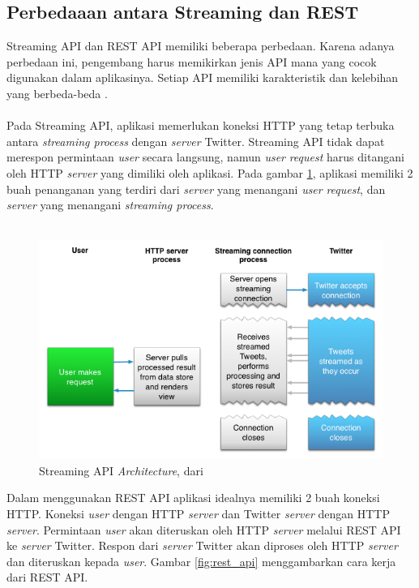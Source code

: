 \subsection{Perbedaaan antara Streaming dan REST}
Streaming API dan REST API memiliki beberapa perbedaan. Karena adanya perbedaan ini, pengembang harus memikirkan jenis API mana yang cocok digunakan dalam aplikasinya. Setiap API memiliki karakteristik dan kelebihan yang berbeda-beda \cite{StreamingAPI:2015}.\\\\
Pada Streaming API, aplikasi memerlukan koneksi HTTP yang tetap terbuka antara \textit{streaming process} dengan \textit{server}  Twitter. Streaming API tidak dapat merespon permintaan \textit{user} secara langsung, namun \textit{user} \textit{request} harus ditangani oleh HTTP \textit{server}  yang dimiliki oleh aplikasi. Pada gambar \ref{fig:stream_api}, aplikasi memiliki 2 buah penanganan yang terdiri dari \textit{server}  yang menangani \textit{user} \textit{request}, dan \textit{server}  yang menangani \textit{streaming process}.\\\\
\begin{figure}
\centering
\includegraphics[width=\linewidth]{Gambar/mine/streamingapi}
\caption[Streaming API \textit{Architecture}, dari \cite{StreamingAPI:2015}]{Streaming API \textit{Architecture}, dari \cite{StreamingAPI:2015}} 
\label{fig:stream_api}
\end{figure}
Dalam menggunakan REST API aplikasi idealnya memiliki 2 buah koneksi HTTP. Koneksi \textit{user} dengan HTTP \textit{server}  dan Twitter \textit{server}  dengan HTTP \textit{server}. Permintaan \textit{user} akan diteruskan oleh HTTP \textit{server}  melalui REST API ke \textit{server}  Twitter. Respon dari \textit{server}  Twitter akan diproses oleh HTTP \textit{server}  dan diteruskan kepada \textit{user}. Gambar \ref{fig:rest_api} menggambarkan cara kerja dari REST API.\\
